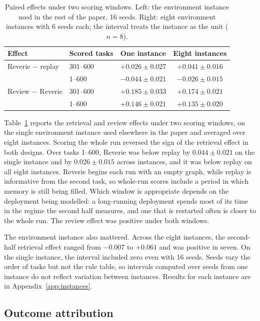 \documentclass{article}
\begin{document}
\begin{table}[t]
\centering
\caption{Paired effects under two scoring windows. Left: the environment instance used
in the rest of the paper, 16 seeds. Right: eight environment instances with 6 seeds
each; the interval treats the instance as the unit ($n = 8$).}
\label{tab:protocol}
\small
\begin{tabular}{llcc}
\toprule
Effect & Scored tasks & One instance & Eight instances \\
\midrule
Reverie $-$ replay & 301--600 & $+0.026 \pm 0.027$ & $+0.041 \pm 0.016$ \\
                   & 1--600   & $-0.044 \pm 0.021$ & $-0.026 \pm 0.015$ \\
\addlinespace
Review $-$ Reverie & 301--600 & $+0.185 \pm 0.033$ & $+0.174 \pm 0.021$ \\
                   & 1--600   & $+0.146 \pm 0.021$ & $+0.135 \pm 0.020$ \\
\bottomrule
\end{tabular}
\end{table}

Table~\ref{tab:protocol} reports the retrieval and review effects under two scoring
windows, on the single environment instance used elsewhere in the paper and averaged
over eight instances. Scoring the whole run reversed the sign of the retrieval effect
in both designs. Over tasks 1--600, Reverie was below replay by $0.044 \pm 0.021$ on the
single instance and by $0.026 \pm 0.015$ across instances, and it was below replay on all
eight instances. Reverie begins each run with an empty graph, while replay is
informative from the second task, so whole-run scores include a period in which memory
is still being filled. Which window is appropriate depends on the deployment being
modelled: a long-running deployment spends most of its time in the regime the second
half measures, and one that is restarted often is closer to the whole run. The review
effect was positive under both windows.

The environment instance also mattered. Across the eight instances, the second-half
retrieval effect ranged from $-0.007$ to $+0.061$ and was positive in seven. On the
single instance, the interval included zero even with 16 seeds. Seeds vary the order of
tasks but not the rule table, so intervals computed over seeds from one instance do not
reflect variation between instances. Results for each instance are in
Appendix~\ref{app:instances}.

\subsection{Outcome attribution}
\label{sec:attribution}
\end{document}
